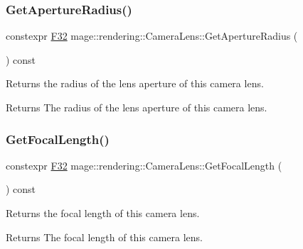 \subsubsection{\texorpdfstring{Get\+Aperture\+Radius()}{GetApertureRadius()}}
{\footnotesize\ttfamily constexpr \mbox{\hyperlink{namespacemage_aa97e833b45f06d60a0a9c4fc22ae02c0}{F32}} mage\+::rendering\+::\+Camera\+Lens\+::\+Get\+Aperture\+Radius (\begin{DoxyParamCaption}{ }\end{DoxyParamCaption}) const\hspace{0.3cm}{\ttfamily [noexcept]}}

Returns the radius of the lens aperture of this camera lens.

\begin{DoxyReturn}{Returns}
The radius of the lens aperture of this camera lens. 
\end{DoxyReturn}
\mbox{\label{classmage_1_1rendering_1_1_camera_lens_a3372be41a251db2a691a84a6413d7ac9}} 
\subsubsection{\texorpdfstring{Get\+Focal\+Length()}{GetFocalLength()}}
{\footnotesize\ttfamily constexpr \mbox{\hyperlink{namespacemage_aa97e833b45f06d60a0a9c4fc22ae02c0}{F32}} mage\+::rendering\+::\+Camera\+Lens\+::\+Get\+Focal\+Length (\begin{DoxyParamCaption}{ }\end{DoxyParamCaption}) const\hspace{0.3cm}{\ttfamily [noexcept]}}

Returns the focal length of this camera lens.

\begin{DoxyReturn}{Returns}
The focal length of this camera lens. 
\end{DoxyReturn}
\mbox{\label{classmage_1_1rendering_1_1_camera_lens_aaca19c16506a65b2cb66ca6de737c712}} 
